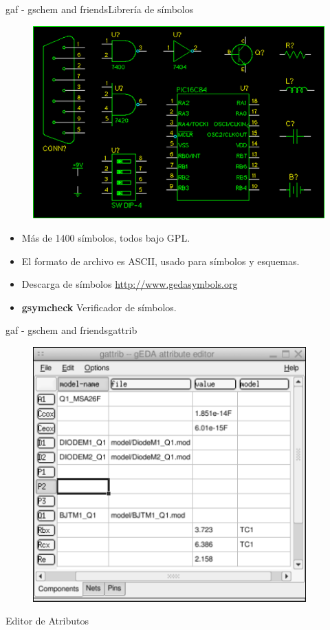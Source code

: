 \documentclass{beamer}
\begin{document}
\begin{frame}{gaf - gschem and friends}{Librería de símbolos}
  \begin{figure}[!h]
    \centering
    \includegraphics[scale=0.25]{img/simbolos.png}
  \end{figure}
  \begin{itemize}
  \item Más de 1400 símbolos, todos bajo GPL.
  \item El formato de archivo es ASCII, usado para símbolos y esquemas.
  \item Descarga de símbolos \url{http://www.gedasymbols.org}
  \item \textbf{gsymcheck} Verificador de símbolos.
  \end{itemize}
\end{frame}

\begin{frame}{gaf - gschem and friends}{gattrib}
  \begin{figure}[!h]
    \centering
    \includegraphics[scale=0.4]{img/gattrib.png}
  \end{figure}
  Editor de Atributos
\end{frame}
\end{document}
